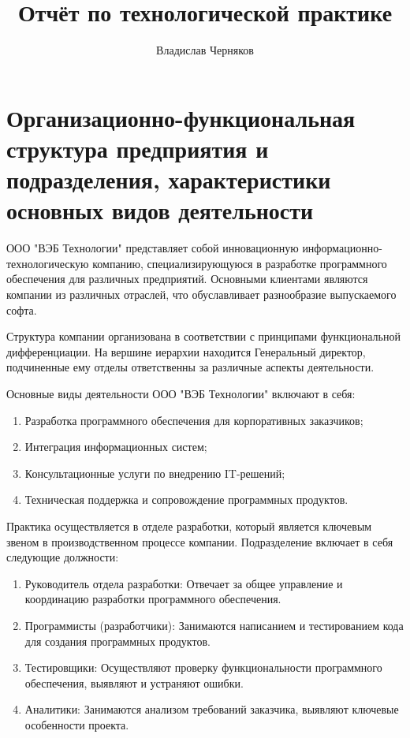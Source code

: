 \documentclass[12pt,a4paper,draft]{report}
\title{Отчёт по технологической практике}
\author{Владислав Черняков}
\begin{document}
\maketitle

\tableofcontents

\chapter{Организационно-функциональная структура предприятия и подразделения, характеристики основных видов деятельности}

ООО "ВЭБ Технологии" представляет собой инновационную информационно-технологическую компанию, специализирующуюся в разработке программного обеспечения для различных предприятий.
Основными клиентами являются компании из различных отраслей, что обуславливает разнообразие выпускаемого софта.

Структура компании организована в соответствии с принципами функциональной дифференциации.
На вершине иерархии находится Генеральный директор, подчиненные ему отделы ответственны за различные аспекты деятельности.

Основные виды деятельности ООО "ВЭБ Технологии" включают в себя:
\begin{enumerate}
    \item Разработка программного обеспечения для корпоративных заказчиков;
    \item Интеграция информационных систем;
    \item Консультационные услуги по внедрению IT-решений;
    \item Техническая поддержка и сопровождение программных продуктов.
\end{enumerate}

Практика осуществляется в отделе разработки, который является ключевым звеном в производственном процессе компании.
Подразделение включает в себя следующие должности:
\begin{enumerate}
    \item Руководитель отдела разработки: Отвечает за общее управление и координацию разработки программного обеспечения.
    \item Программисты (разработчики): Занимаются написанием и тестированием кода для создания программных продуктов.
    \item Тестировщики: Осуществляют проверку функциональности программного обеспечения, выявляют и устраняют ошибки.
    \item Аналитики: Занимаются анализом требований заказчика, выявляют ключевые особенности проекта.
\end{enumerate}
\end{document}
